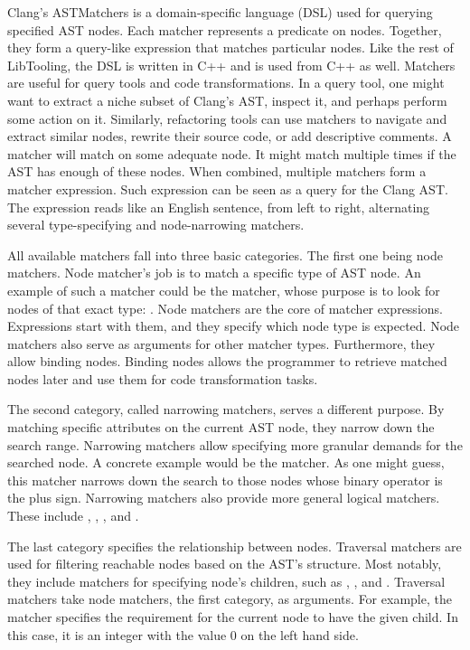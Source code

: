 Clang's ASTMatchers \citep{matchers:online} 
is a domain-specific language (DSL) used for querying 
specified AST nodes. 
Each matcher represents a predicate on nodes. 
Together, they form a query-like expression that matches particular nodes. 
Like the rest of LibTooling, the DSL is written in C++ and is used from 
C++ as well.
Matchers are useful for query tools and code transformations. 
In a query tool, one might want to extract a niche subset of Clang's AST, 
inspect it, and perhaps perform some action on it. 
Similarly, refactoring tools can use matchers to navigate and extract 
similar nodes, rewrite their source code, or add descriptive comments.
A matcher will match on some adequate node. 
It might match multiple times if the AST has enough of these nodes. 
When combined, multiple matchers form a matcher expression. 
Such expression can be seen as a query for the Clang AST. 
The expression reads like an English sentence, from left to right, 
alternating several type-specifying and node-narrowing matchers.

All available matchers fall into three basic categories. 
The first one being node matchers. 
Node matcher's job is to match a specific type of AST node. 
An example of such a matcher could be the  
matcher, whose purpose is to look for nodes of that exact 
type: . 
Node matchers are the core of matcher expressions. 
Expressions start with them, and they specify which node type is expected. 
Node matchers also serve as arguments for other matcher types. 
Furthermore, they allow binding nodes. 
Binding nodes allows the programmer to retrieve matched nodes later and 
use them for code transformation tasks. 

The second category, called narrowing matchers, serves a different purpose. 
By matching specific attributes on the current AST node, they narrow down 
the search range. 
Narrowing matchers allow specifying more granular demands for the searched 
node. 
A concrete example would be the  matcher. 
As one might guess, this matcher narrows down the search to those nodes 
whose binary operator is the plus sign. 
Narrowing matchers also provide more general logical matchers. 
These include , , , 
and .

The last category specifies the relationship between nodes. 
Traversal matchers are used for filtering reachable nodes based on 
the AST's structure. 
Most notably, they include matchers for specifying node's children, 
such as , , and . 
Traversal matchers take node matchers, the first category, as arguments. 
For example, the  matcher specifies
the requirement for the current node to have the given child. 
In this case, it is an integer with the value 0 on the left hand side.

